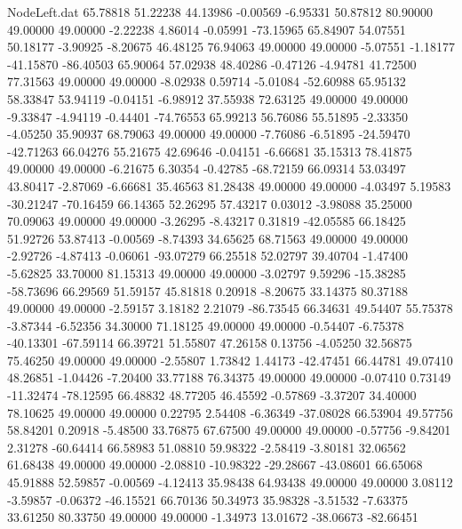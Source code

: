 \begin{filecontents}{NodeLeft.dat}
  65.78818   51.22238   44.13986    -0.00569   -6.95331   50.87812   80.90000   49.00000   49.00000   -2.22238    4.86014   -0.05991  -73.15965
  65.84907   54.07551   50.18177    -3.90925   -8.20675   46.48125   76.94063   49.00000   49.00000   -5.07551   -1.18177  -41.15870  -86.40503
  65.90064   57.02938   48.40286    -0.47126   -4.94781   41.72500   77.31563   49.00000   49.00000   -8.02938    0.59714   -5.01084  -52.60988
  65.95132   58.33847   53.94119    -0.04151   -6.98912   37.55938   72.63125   49.00000   49.00000   -9.33847   -4.94119   -0.44401  -74.76553
  65.99213   56.76086   55.51895    -2.33350   -4.05250   35.90937   68.79063   49.00000   49.00000   -7.76086   -6.51895  -24.59470  -42.71263
  66.04276   55.21675   42.69646    -0.04151   -6.66681   35.15313   78.41875   49.00000   49.00000   -6.21675    6.30354   -0.42785  -68.72159
  66.09314   53.03497   43.80417    -2.87069   -6.66681   35.46563   81.28438   49.00000   49.00000   -4.03497    5.19583  -30.21247  -70.16459
  66.14365   52.26295   57.43217     0.03012   -3.98088   35.25000   70.09063   49.00000   49.00000   -3.26295   -8.43217    0.31819  -42.05585
  66.18425   51.92726   53.87413    -0.00569   -8.74393   34.65625   68.71563   49.00000   49.00000   -2.92726   -4.87413   -0.06061  -93.07279
  66.25518   52.02797   39.40704    -1.47400   -5.62825   33.70000   81.15313   49.00000   49.00000   -3.02797    9.59296  -15.38285  -58.73696
  66.29569   51.59157   45.81818     0.20918   -8.20675   33.14375   80.37188   49.00000   49.00000   -2.59157    3.18182    2.21079  -86.73545
  66.34631   49.54407   55.75378    -3.87344   -6.52356   34.30000   71.18125   49.00000   49.00000   -0.54407   -6.75378  -40.13301  -67.59114
  66.39721   51.55807   47.26158     0.13756   -4.05250   32.56875   75.46250   49.00000   49.00000   -2.55807    1.73842    1.44173  -42.47451
  66.44781   49.07410   48.26851    -1.04426   -7.20400   33.77188   76.34375   49.00000   49.00000   -0.07410    0.73149  -11.32474  -78.12595
  66.48832   48.77205   46.45592    -0.57869   -3.37207   34.40000   78.10625   49.00000   49.00000    0.22795    2.54408   -6.36349  -37.08028
  66.53904   49.57756   58.84201     0.20918   -5.48500   33.76875   67.67500   49.00000   49.00000   -0.57756   -9.84201    2.31278  -60.64414
  66.58983   51.08810   59.98322    -2.58419   -3.80181   32.06562   61.68438   49.00000   49.00000   -2.08810  -10.98322  -29.28667  -43.08601
  66.65068   45.91888   52.59857    -0.00569   -4.12413   35.98438   64.93438   49.00000   49.00000    3.08112   -3.59857   -0.06372  -46.15521
  66.70136   50.34973   35.98328    -3.51532   -7.63375   33.61250   80.33750   49.00000   49.00000   -1.34973   13.01672  -38.06673  -82.66451

\end{filecontents}
